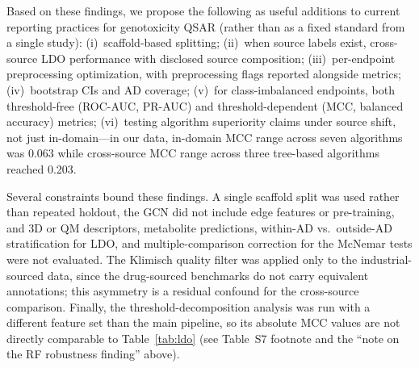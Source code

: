 Based on these findings, we propose the following as useful additions to current reporting 
practices for genotoxicity QSAR (rather than as a fixed standard from a single study): 
(i)~scaffold-based splitting; 
(ii)~when source labels exist, cross-source LDO performance with disclosed source composition; 
(iii)~per-endpoint preprocessing optimization, with preprocessing flags reported alongside 
metrics; 
(iv)~bootstrap CIs and AD coverage; 
(v)~for class-imbalanced endpoints, both threshold-free (ROC-AUC, PR-AUC) and 
threshold-dependent (MCC, balanced accuracy) metrics; 
(vi)~testing algorithm superiority claims under source shift, not just in-domain---in our 
data, in-domain MCC range across seven algorithms was 0.063 while cross-source MCC range 
across three tree-based algorithms reached 0.203.

Several constraints bound these findings. A single scaffold split was used rather than 
repeated holdout, the GCN did not include edge features or 
pre-training,\cite{Hu_2020_pretrain} and 3D or QM descriptors, metabolite predictions, 
within-AD vs.\ outside-AD stratification for LDO, and multiple-comparison correction for the 
McNemar tests\cite{Demsar_2006} were not evaluated. The Klimisch quality filter was applied 
only to the industrial-sourced data, since the drug-sourced benchmarks do not carry 
equivalent annotations; this asymmetry is a residual confound for the cross-source 
comparison. Finally, the threshold-decomposition analysis was run with a different feature 
set than the main pipeline, so its absolute MCC values are not directly comparable to 
Table~\ref{tab:ldo} (see Table~S7 footnote and the ``note on the RF robustness finding'' 
above).
